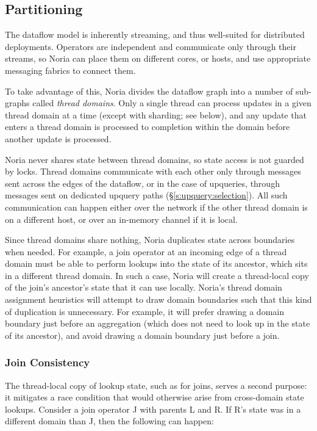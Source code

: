 \subsection{Partitioning}
\label{s:noria:partitioning}

The dataflow model is inherently streaming, and thus well-suited for distributed
deployments. Operators are independent and communicate only through their
streams, so Noria can place them on different cores, or hosts, and use
appropriate messaging fabrics to connect them.

To take advantage of this, Noria divides the dataflow graph into a number of
sub-graphs called \textit{thread domains}. Only a single thread can process
updates in a given thread domain at a time (except with sharding; see below),
and any update that enters a thread domain is processed to completion within
the domain before another update is processed.

Noria never shares state between thread domains, so state access is not guarded
by locks. Thread domains communicate with each other only through messages sent
across the edges of the dataflow, or in the case of upqueries, through messages
sent on dedicated upquery paths (\S\ref{s:upquery:selection}). All such
communication can happen either over the network if the other thread domain is
on a different host, or over an in-memory channel if it is local.

Since thread domains share nothing, Noria duplicates state across boundaries
when needed. For example, a join operator at an incoming edge of a thread domain
must be able to perform lookups into the state of its ancestor, which sits in a
different thread domain. In such a case, Noria will create a thread-local copy
of the join's ancestor's state that it can use locally. Noria's thread domain
assignment heuristics will attempt to draw domain boundaries  such that this
kind of duplication is unnecessary. For example, it will prefer drawing a domain
boundary just before an aggregation (which does not need to look up in the state
of its ancestor), and avoid drawing a domain boundary just before a join.

\subsubsection{Join Consistency}
\label{s:join-state-dupe}

The thread-local copy of lookup state, such as for joins, serves a second
purpose: it mitigates a race condition that would otherwise arise from
cross-domain state lookups. Consider a join operator J with parents L and R. If
R's state was in a different domain than J, then the following can happen:

